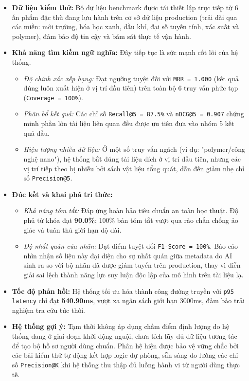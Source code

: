 \begin{itemize}
    \item \textbf{Dữ liệu kiểm thử:} Bộ dữ liệu benchmark được tái thiết lập trực tiếp từ 6 ấn phẩm đặc thù đang lưu hành trên cơ sở dữ liệu production (trải dài qua các miền: môi trường, hóa học xanh, dầu khí, đại số tuyến tính, xác suất và polymer), đảm bảo độ tin cậy và bám sát thực tế vận hành.

    \item \textbf{Khả năng tìm kiếm ngữ nghĩa:} Đây tiếp tục là sức mạnh cốt lõi của hệ thống.
    \begin{itemize}
        \item \textit{Độ chính xác xếp hạng:} Đạt ngưỡng tuyệt đối với \texttt{MRR = 1.000} (kết quả đúng luôn xuất hiện ở vị trí đầu tiên) trên toàn bộ 6 truy vấn phức tạp (\texttt{Coverage = 100\%}).
        \item \textit{Phân bổ kết quả:} Các chỉ số \texttt{Recall@5 = 87.5\%} và \texttt{nDCG@5 = 0.907} chứng minh phần lớn tài liệu liên quan đều được ưu tiên đưa vào nhóm 5 kết quả đầu.
        \item \textit{Hiện tượng nhiễu dữ liệu:} Ở một số truy vấn ngách (ví dụ: "polymer/công nghệ nano"), hệ thống bắt đúng tài liệu đích ở vị trí đầu tiên, nhưng các vị trí tiếp theo bị nhiễu bởi sách vật liệu tổng quát, dẫn đến giảm nhẹ chỉ số \texttt{Precision@5}.
    \end{itemize}

    \item \textbf{Đúc kết và khai phá tri thức:}
    \begin{itemize}
        \item \textit{Khả năng tóm tắt:} Đáp ứng hoàn hảo tiêu chuẩn an toàn học thuật. Độ phủ từ khóa đạt \textbf{90.0\%}; 100\% bản tóm tắt vượt qua rào chắn chống ảo giác và tuân thủ giới hạn độ dài.
        \item \textit{Độ nhất quán của nhãn:} Đạt điểm tuyệt đối \texttt{F1-Score = 100\%}. Báo cáo nhìn nhận số liệu này đại diện cho sự nhất quán giữa metadata do AI sinh ra so với bộ nhãn đã được giám tuyển trên production, thay vì diễn giải sai lệch thành năng lực suy luận độc lập của mô hình trên tài liệu lạ.
    \end{itemize}

    \item \textbf{Tốc độ phản hồi:} Hệ thống tối ưu hóa thành công đường truyền với \texttt{p95 latency} chỉ đạt \textbf{540.90ms}, vượt xa ngân sách giới hạn 3000ms, đảm bảo trải nghiệm tra cứu tức thời.

    \item \textbf{Hệ thống gợi ý:} Tạm thời không áp dụng chấm điểm định lượng do hệ thống đang ở giai đoạn khởi động nguội, chưa tích lũy đủ dữ liệu tương tác để tạo bộ hồ sơ người dùng chuẩn. Phân hệ hiện được bảo vệ vững chắc bởi các bài kiểm thử tự động kết hợp logic dự phòng, sẵn sàng đo lường các chỉ số \texttt{Precision@K} khi hệ thống thu thập đủ luồng hành vi từ người dùng thực tế.
\end{itemize}


